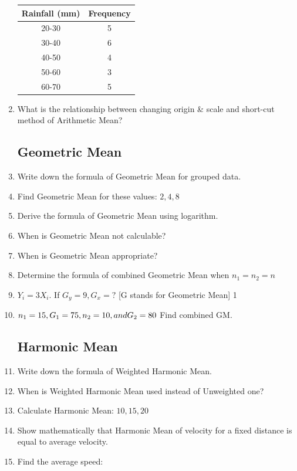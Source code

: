 \documentclass[a4paper,oneside]{book}
\begin{document}
\begin{enumerate}
    \begin{table}[h]
    \centering
\begin{tabular}{c|c}
\textbf{Rainfall (mm)} & \textbf{Frequency} \\ \hline
20-30                  & 5                  \\ \hline
30-40                  & 6                  \\ \hline
40-50                  & 4                  \\ \hline
50-60                  & 3                  \\
60-70                  & 5                 
\end{tabular}
\end{table}

    \item What is the relationship between changing origin \& scale and short-cut method of Arithmetic Mean?

\subsection{Geometric Mean}    
    \item Write down the formula of Geometric Mean for grouped data.
    \item Find Geometric Mean for these values: $2, 4, 8$
    \item Derive the formula of Geometric Mean using logarithm.
    \item When is Geometric Mean not calculable?
    \item When is Geometric Mean appropriate?
    \item Determine the formula of combined Geometric Mean when $n_1=n_2=n$
    \item $Y_i = 3X_i$. If $G_y = 9, G_x=?$ [G stands for Geometric Mean] \hfill 1
    \item $n_1=15, G_1=75, n_2=10, \space and \space G_2=80$ Find combined GM.

\subsection{Harmonic Mean}

    \item Write down the formula of Weighted Harmonic Mean.
    \item When is Weighted Harmonic Mean used instead of Unweighted one?
    \item Calculate Harmonic Mean: $10,15,20$
    \item Show mathematically that Harmonic Mean of velocity for a fixed distance is equal to average velocity.
    \item Find the average speed:
    

\end{enumerate}
\end{document}
